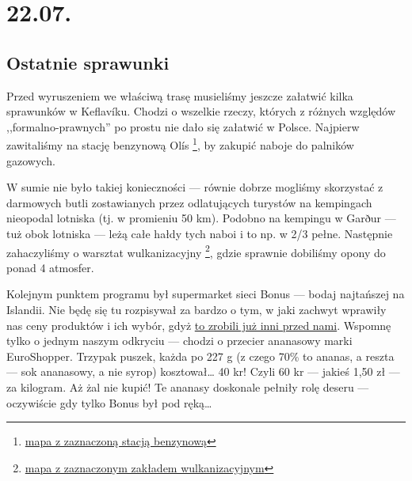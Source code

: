 \chapter*{22.07.}

\section*{Ostatnie sprawunki}

\indent Przed wyruszeniem we właściwą trasę musieliśmy jeszcze załatwić kilka sprawunków w Keflavíku. Chodzi o wszelkie rzeczy, których z różnych względów ,,formalno-prawnych'' po prostu nie dało się załatwić w Polsce.
Najpierw zawitaliśmy na stację benzynową Olís \footnote{\href{https://www.google.com/url?q=https\%3A\%2F\%2Fmaps.google.com\%2Fmaps\%3Fq\%3D63.979816\%2C-22.54672}{mapa z zaznaczoną stacją benzynową}}, by zakupić naboje do palników gazowych.

W sumie nie było takiej konieczności --- równie dobrze mogliśmy skorzystać z darmowych butli zostawianych przez odlatujących turystów na kempingach nieopodal lotniska (tj. w promieniu 50 km). Podobno na kempingu w Garður --- tuż obok lotniska --- leżą całe hałdy tych naboi i to np. w 2/3 pełne.
Następnie zahaczyliśmy o warsztat wulkanizacyjny \footnote{\href{https://www.google.com/url?q=https\%3A\%2F\%2Fmaps.google.com\%2Fmaps\%3Fq\%3D63.982619\%2C-22.546328}{mapa z zaznaczonym zakładem wulkanizacyjnym}}, gdzie sprawnie dobiliśmy opony do ponad 4 atmosfer.



Kolejnym punktem programu był supermarket sieci Bonus --- bodaj najtańszej na Islandii. Nie będę się tu rozpisywał za bardzo o tym, w jaki zachwyt wprawiły nas ceny produktów i ich wybór, gdyż \href{http://www.roboppy.net/food/2009/04/iceland-day-1-part-ii-reykjavik-bonus-supermarket-skyr.html}{to zrobili już inni przed nami}. Wspomnę tylko o jednym naszym odkryciu --- chodzi o przecier ananasowy marki EuroShopper. Trzypak puszek, każda po 227 g (z czego 70\% to ananas, a reszta --- sok ananasowy, a nie syrop) kosztował… 40 kr! Czyli 60 kr --- jakieś 1,50 zł --- za kilogram. Aż żal nie kupić! Te ananasy doskonale pełniły rolę deseru --- oczywiście gdy tylko Bonus był pod ręką…

